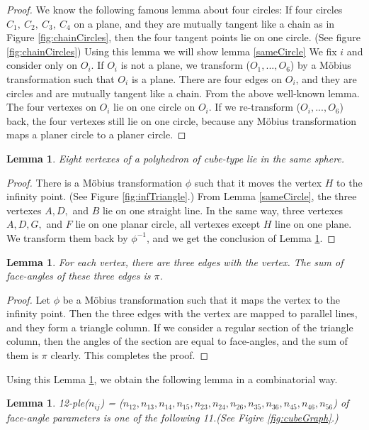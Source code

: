 \documentclass[suppldata, dvipdfmx]{interact}
\theoremstyle{plain}%
\newtheorem{lemma}[theorem]{Lemma}
\theoremstyle{definition}
\theoremstyle{remark}
\theoremstyle{problemstyle}
\begin{document}
\begin{proof}
 We know the following famous lemma about four circles: If four circles 
 $C_1,~C_2,~C_3,~C_4$ on a plane, and they are mutually tangent like a
 chain as in Figure \ref{fig:chainCircles}, then the four tangent points lie on one circle.
 (See figure \ref{fig:chainCircles}) Using this lemma we will show lemma \ref{sameCircle} We fix $i$ and
 consider only on $O_i$. If $O_i$ is not a plane, we transform 
 ($O_1, ..., O_6$) by a M\"obius transformation such that $O_i$ is a
 plane. There are four edges on $O_i$, and they are circles and are
 mutually tangent like a chain. From the above well-known lemma. The
 four vertexes on $O_i$ lie on one circle on $O_i$. If we re-transform
 ($O_i, ..., O_6$) back, the four vertexes still lie on one circle,
 because any M\"obius transformation maps a planer circle to a planer circle.
\end{proof}

\begin{lemma}\label{eightVertexes}
 Eight vertexes of a polyhedron of cube-type lie in the same sphere.
\end{lemma}

\begin{proof}
 There is a M\"obius transformation $\phi$ such that it moves the vertex
 $H$ to the infinity point. (See Figure \ref{fig:infTriangle}.) From Lemma \ref{sameCircle}, the three
 vertexes $A, D,$ and $B$ lie on one straight line. In the same way,
 three vertexes $A, D, G,$ and $F$ lie on one planar circle, all vertexes
 except $H$ line on one plane. We transform them back by $\phi^{-1}$, and
 we get the conclusion of Lemma \ref{eightVertexes}.
\end{proof}

\begin{lemma}\label{sum}
 For each vertex, there are three edges with the vertex. The sum of
 face-angles of these three edges is $\pi$.
\end{lemma}

\begin{proof}
 Let $\phi$ be a M\"obius transformation such that it maps the vertex to
 the infinity point. Then the three edges with the vertex are mapped to
 parallel lines, and they form a triangle column. If we consider a
 regular section of the triangle column, then the angles of the section
 are equal to face-angles, and the sum of them is $\pi$ clearly. This
 completes the proof.
\end{proof}

 Using this Lemma \ref{sum}, we obtain the following lemma in a combinatorial way.
\begin{lemma}\label{combination}
 12-ple($n_{ij}$) = ($n_{12}, n_{13}, n_{14}, n_{15}, n_{23}, n_{24},
 n_{26}, n_{35}, n_{36}, n_{45}, n_{46}, n_{56}$) of face-angle
 parameters is one of the following 11.(See Figire \ref{fig:cubeGraph}.)
\end{lemma}
\end{document}
